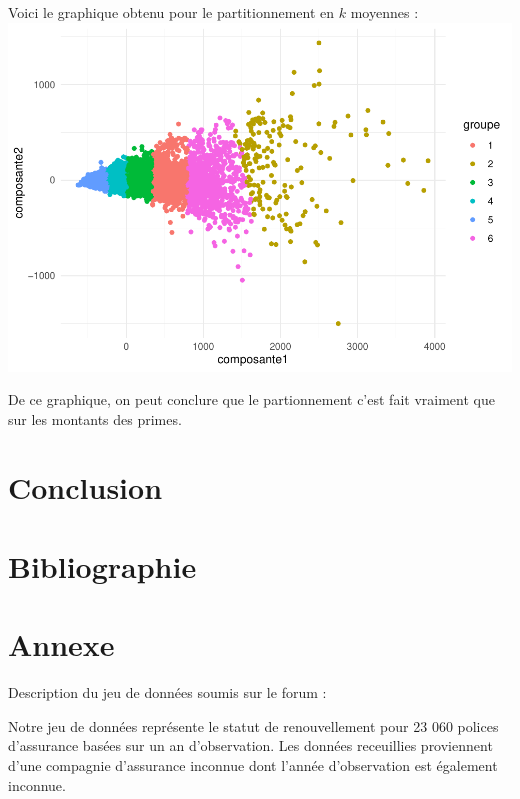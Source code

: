 \documentclass[
]{article}
\begin{document}
Voici le graphique obtenu pour le partitionnement en \(k\) moyennes :
\includegraphics{01-01-Pretraitement_files/figure-latex/unnamed-chunk-6-1.pdf}

De ce graphique, on peut conclure que le partionnement c'est fait
vraiment que sur les montants des primes.

\newpage

\hypertarget{conclusion}{%
\section{Conclusion}\label{conclusion}}

\newpage

\hypertarget{bibliographie}{%
\section{Bibliographie}\label{bibliographie}}

\newpage

\hypertarget{annexe}{%
\section{Annexe}\label{annexe}}

Description du jeu de données soumis sur le forum :

Notre jeu de données représente le statut de renouvellement pour 23 060
polices d'assurance basées sur un an d'observation. Les données
receuillies proviennent d'une compagnie d'assurance inconnue dont
l'année d'observation est également inconnue.
\end{document}
